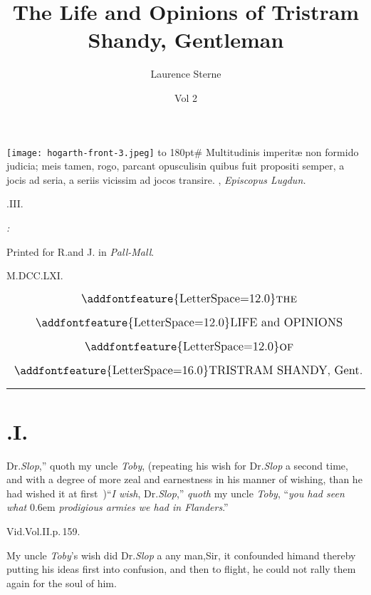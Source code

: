 \documentclass{article}
\title{The Life and Opinions of Tristram Shandy, Gentleman}
\author{Laurence Sterne}
\date{Vol 2}
\begin{document}
\pagestyle{empty}
\null\newpage
\noindent\texttt{[image: hogarth-front-3.jpeg]}
\newpage
\vbox{\openup 10pt}
\vfill
\vbox{\openup -2pt\halign to 180pt{\footnotesize #\cr
Multitudinis imperitæ non formido judicia; meis\cr
\quad tamen, rogo, parcant opusculis\tsh in quibus\cr
\quad fuit propositi semper, a jocis ad seria, a seriis\cr
\quad vicissim ad jocos transire.\hfill\cr
\hfill {},\cr
\hfill \textit{Episcopus Lugdun.}\cr}}
\vfill
\centerline{.\quad III.}
\vfill
\centerline{\itshape{}:}
\centerline{\smaller Printed for R.\@ and J.\@ {} in \textit{Pall-Mall}.}
\centerline{M.DCC.LXI.}
\newpage
\null
\newpage
\pagestyle{fancy}
\thispagestyle{empty}
\[\vbox{\openup 12pt\halign to \textwidth{\hss\large # \hss\cr
\addfontfeature{LetterSpace=12.0}\textsc{the}\cr
\addfontfeature{LetterSpace=12.0}LIFE and OPINIONS\cr
\addfontfeature{LetterSpace=12.0}\textsc{of}\cr
{\addfontfeature{LetterSpace=16.0}TRISTRAM SHANDY}, Gent.\cr}}\]

\vskip 12pt
\hrule
\setlength{\baselineskip}{14pt}  %
\setcounter{page}{5}
\section{.\quad  I.}

Dr.\@ \textit{Slop},” quoth my\break
uncle \textit{Toby}, (repeating his\break
wish for Dr.\@ \textit{Slop} a second time,
and with a degree of more zeal and earnestness in his manner of wishing, than he had
wished it at first \fnast\,)\tsh “\textit{I wish}, Dr.\@ \textit{Slop},” \textit{quoth} my
uncle \textit{Toby}, “\textit{you had seen what}\break
{}\kern 0.6em \textit{prodigious armies we had in Flanders}.”

\bgroup\footnotesize
\indent\fnast\enspace Vid.\@ Vol.\@ II.\@ p.\,159.\par
\egroup
{}
\newpage
My uncle \textit{Toby}’s wish did Dr.\@ \textit{Slop} a
 any man,\tsh Sir, it
confounded him\tsh and thereby putting his ideas first into
confusion, and then to flight, he could not rally them again for
the soul of him.
\end{document}
